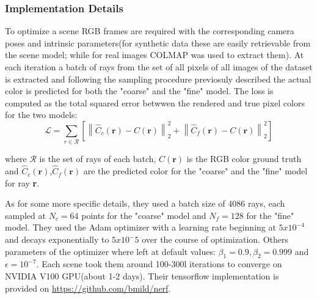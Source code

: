 \subsubsection{Implementation Details}
To optimize a scene RGB frames are required with the corresponding camera poses and intrinsic
parameters(for synthetic data these are easily retrievable from the scene model; while for
real images COLMAP was used to extract them).
At each iteration a batch of rays from the set of all pixels of all images of the dataset
is extracted and following the sampling procedure previosuly described the actual color 
is predicted for both the "coarse" and the "fine" model. The loss is computed as the 
total squared error betwwen the rendered and true pixel colors for the two models:
\begin{equation}
    \mathcal{L} = \sum_{r\in\mathcal{R} }[\left\lVert {\hat{C}_c(\textbf{r})-C(\textbf{r})} \right\rVert_2^2+\left\lVert {\hat{C}_f(\textbf{r})-C(\textbf{r})} \right\rVert_2^2]
\end{equation}

where $\mathcal{R}$ is the set of rays of each batch, $C(\textbf{r})$ is the RGB color
ground truth and $\hat{C}_c(\textbf{r})$,$\hat{C}_f(\textbf{r})$ are the predicted color
for the "coarse" and the "fine" model for ray \textbf{r}.

As for some more specific details, they used a batch size of 4086 rays, each
sampled at $N_c=64$ points for the "coarse" model and $N_f=128$ for the "fine"
model. They used the Adam optimizer with a learning rate beginning at $5x10^{-4}$
and decays exponentially to $5x10^-5$ over the course of optimization. Others parameters
of the optimizer where left at default values: $\beta_1 = 0.9,\beta_2=0.999$ and $\epsilon=10^{-7}$.
Each scene took them around 100-300l iterations to converge on NVIDIA V100 GPU(about 1-2 days).
Their tensorflow implementation is provided on \url{https://github.com/bmild/nerf}.

